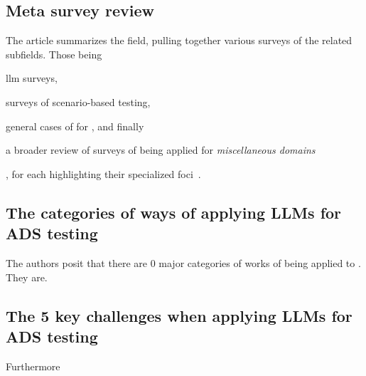 \subsection{Meta survey review}

The article summarizes the field, pulling together various surveys of the
related subfields. Those being \begin{inparaenum}
  \item \acrshort{llm} surveys,
  \item surveys of scenario-based testing,
  \item general cases of  for , and finally
  \item a broader review of surveys of  being applied for
  \textit{miscellaneous domains}
\end{inparaenum},
for each highlighting their specialized
foci~\cite[2]{surveyLLMScenarioBasedTesting}.

\subsection{The categories of ways of applying LLMs for ADS testing}

The authors posit that there are \num{0} major categories of works of
 being applied to . They are.

\subsection{The \num{5} key challenges when applying LLMs for ADS testing}

Furthermore
